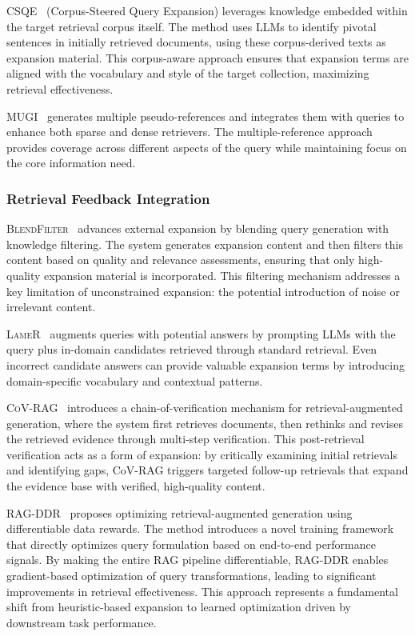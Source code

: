 \documentclass{article}
\begin{document}
\textsc{CSQE}~\citep{CSQE} (Corpus-Steered Query Expansion) leverages knowledge embedded within the target retrieval corpus itself. The method uses LLMs to identify pivotal sentences in initially retrieved documents, using these corpus-derived texts as expansion material. This corpus-aware approach ensures that expansion terms are aligned with the vocabulary and style of the target collection, maximizing retrieval effectiveness.

\textsc{MUGI}~\citep{MUGI} generates multiple pseudo-references and integrates them with queries to enhance both sparse and dense retrievers. The multiple-reference approach provides coverage across different aspects of the query while maintaining focus on the core information need.

\subsubsection{Retrieval Feedback Integration}

\textsc{BlendFilter}~\citep{BlendFilter} advances external expansion by blending query generation with knowledge filtering. The system generates expansion content and then filters this content based on quality and relevance assessments, ensuring that only high-quality expansion material is incorporated. This filtering mechanism addresses a key limitation of unconstrained expansion: the potential introduction of noise or irrelevant content.

\textsc{LameR}~\citep{LameR} augments queries with potential answers by prompting LLMs with the query plus in-domain candidates retrieved through standard retrieval. Even incorrect candidate answers can provide valuable expansion terms by introducing domain-specific vocabulary and contextual patterns.

\textsc{CoV-RAG}~\citep{CoV-RAG} introduces a chain-of-verification mechanism for retrieval-augmented generation, where the system first retrieves documents, then rethinks and revises the retrieved evidence through multi-step verification. This post-retrieval verification acts as a form of expansion: by critically examining initial retrievals and identifying gaps, CoV-RAG triggers targeted follow-up retrievals that expand the evidence base with verified, high-quality content.

\textsc{RAG-DDR}~\citep{RAGDDR} proposes optimizing retrieval-augmented generation using differentiable data rewards. The method introduces a novel training framework that directly optimizes query formulation based on end-to-end performance signals. By making the entire RAG pipeline differentiable, RAG-DDR enables gradient-based optimization of query transformations, leading to significant improvements in retrieval effectiveness. This approach represents a fundamental shift from heuristic-based expansion to learned optimization driven by downstream task performance.
\end{document}
